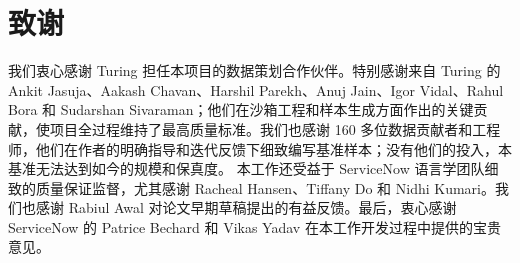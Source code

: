 \section{致谢}
我们衷心感谢 Turing 担任本项目的数据策划合作伙伴。特别感谢来自 Turing 的 Ankit Jasuja、Aakash Chavan、Harshil Parekh、Anuj Jain、Igor Vidal、Rahul Bora 和 Sudarshan Sivaraman；他们在沙箱工程和样本生成方面作出的关键贡献，使项目全过程维持了最高质量标准。我们也感谢 160 多位数据贡献者和工程师，他们在作者的明确指导和迭代反馈下细致编写基准样本；没有他们的投入，本基准无法达到如今的规模和保真度。
本工作还受益于 ServiceNow 语言学团队细致的质量保证监督，尤其感谢 Racheal Hansen、Tiffany Do 和 Nidhi Kumari。我们也感谢 Rabiul Awal 对论文早期草稿提出的有益反馈。最后，衷心感谢 ServiceNow 的 Patrice Bechard 和 Vikas Yadav 在本工作开发过程中提供的宝贵意见。
